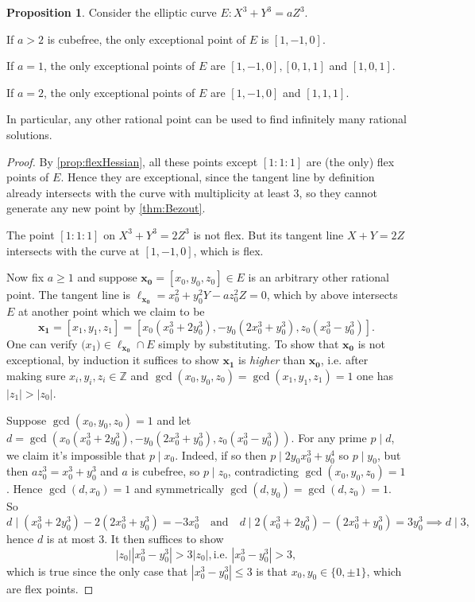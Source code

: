 \documentclass{article}
\newcommand{\Z}{\mathbb{Z}}
\theoremstyle{definition}
\newtheorem{prop}[defn]{Proposition}
\begin{document}
\begin{prop}
Consider the elliptic curve $E:X^3+Y^3=aZ^3$.

If $a>2$ is cubefree, the only exceptional point of $E$ is $[1,-1,0]$.

If $a=1$, the only exceptional points of $E$ are $[1,-1,0],[0,1,1]$ and $[1,0,1]$.

If $a=2$, the only exceptional points of $E$ are $[1,-1,0]$ and $[1,1,1]$.

In particular, any other rational point can be used to find infinitely many rational solutions.
\end{prop}
\begin{proof}
By \ref{prop:flexHessian}, all these points except $[1:1:1]$ are (the only) flex points of $E$. Hence they are exceptional, since the tangent line by definition already intersects with the curve with multiplicity at least 3, so they cannot generate any new point by \ref{thm:Bezout}.

The point $[1:1:1]$ on $X^3+Y^3=2Z^3$ is not flex. But its tangent line $X+Y=2Z$ intersects with the curve at $[1,-1,0]$, which is flex.

Now fix $a\geq 1$ and suppose $\mathbf{x_0}=[x_0,y_0,z_0]\in E$ is an arbitrary other rational point. The tangent line is $\ell_{\mathbf{x_0}}=x_0^2+y_0^2Y-az_0^2Z=0$, which by above intersects $E$ at another point which we claim to be
\[
\mathbf{x_1}=[x_1,y_1,z_1]=[x_0(x_0^3+2y_0^3),-y_0(2x_0^3+y_0^3),z_0(x_0^3-y_0^3)].
\]
One can verify $\mathbf(x_1)\in\ell_{\mathbf{x_0}}\cap E$ simply by substituting. To show that $\mathbf{x_0}$ is not exceptional, by induction it suffices to show $\mathbf{x_1}$ is \textit{higher} than $\mathbf{x_0}$, i.e. after making sure $x_i,y_i,z_i\in\Z$ and $\gcd(x_0,y_0,z_0)=\gcd(x_1,y_1,z_1)=1$ one has $|z_1|>|z_0|$.

Suppose $\gcd(x_0,y_0,z_0)=1$ and let $d=\gcd(x_0(x_0^3+2y_0^3),-y_0(2x_0^3+y_0^3),z_0(x_0^3-y_0^3))$. For any prime $p\mid d$, we claim it's impossible that $p\mid x_0$. Indeed, if so then $p\mid 2y_0x_0^3+y_0^4$ so $p\mid y_0$, but then $az_0^3=x_0^3+y_0^3$ and $a$ is cubefree, so $p\mid z_0$, contradicting $\gcd(x_0,y_0,z_0)=1$. Hence $\gcd(d,x_0)=1$ and symmetrically $\gcd(d,y_0)=\gcd(d,z_0)=1$. So
\[
d\mid (x_0^3+2y_0^3)-2(2x_0^3+y_0^3)=-3x_0^3\quad\text{and}\quad d\mid 2(x_0^3+2y_0^3)-(2x_0^3+y_0^3)=3y_0^3\implies d\mid 3,
\]
hence $d$ is at most 3. It then suffices to show
\[
|z_0||x_0^3-y_0^3|>3|z_0|,\text{i.e. }|x_0^3-y_0^3|>3,
\]
which is true since the only case that $|x_0^3-y_0^3|\leq 3$ is that $x_0,y_0\in\{0,\pm 1\}$, which are flex points.
\end{proof}
\end{document}
